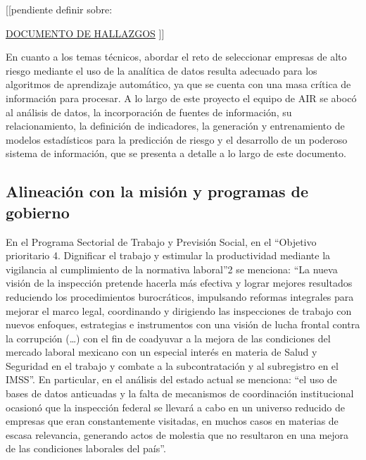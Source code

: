 \documentclass[
]{article}
\begin{document}
{[}{[}pendiente definir sobre:

\href{https://msair.sharepoint.com/:w:/r/sites/Impaq_Projects/Mexico/CALLE/Ongoing\%20Tasks/Data\%20Intelligence/Data\%20Analysis/2022-01\%20An\%C3\%A1lisis\%20SIAPI_SIPAS\%20-\%20Hallazgos.docx?d=wf74a0d86ad244c92a86c8a88e3af6f1e\&csf=1\&web=1\&e=GcTmkv}{DOCUMENTO DE HALLAZGOS}
{]}{]}

En cuanto a los temas técnicos, abordar el reto de seleccionar empresas de alto riesgo mediante el uso de la analítica de datos resulta adecuado para los algoritmos de aprendizaje automático, ya que se cuenta con una masa crítica de información para procesar. A lo largo de este proyecto el equipo de AIR se abocó al análisis de datos, la incorporación de fuentes de información, su relacionamiento, la definición de indicadores, la generación y entrenamiento de modelos estadísticos para la predicción de riesgo y el desarrollo de un poderoso sistema de información, que se presenta a detalle a lo largo de este documento.

\hypertarget{introalineacion}{%
\subsection{Alineación con la misión y programas de gobierno}\label{introalineacion}}

En el Programa Sectorial de Trabajo y Previsión Social, en el ``Objetivo prioritario 4. Dignificar el trabajo y estimular la productividad mediante la vigilancia al cumplimiento de la normativa laboral''2 se menciona: ``La nueva visión de la inspección pretende hacerla más efectiva y lograr mejores resultados reduciendo los procedimientos burocráticos, impulsando reformas integrales para mejorar el marco legal, coordinando y dirigiendo las inspecciones de trabajo con nuevos enfoques, estrategias e instrumentos con una visión de lucha frontal contra la corrupción (\ldots) con el fin de coadyuvar a la mejora de las condiciones del mercado laboral mexicano con un especial interés en materia de Salud y Seguridad en el trabajo y combate a la subcontratación y al subregistro en el IMSS''. En particular, en el análisis del estado actual se menciona: ``el uso de bases de datos anticuadas y la falta de mecanismos de coordinación institucional ocasionó que la inspección federal se llevará a cabo en un universo reducido de empresas que eran constantemente visitadas, en muchos casos en materias de escasa relevancia, generando actos de molestia que no resultaron en una mejora de las condiciones laborales del país''.
\end{document}
